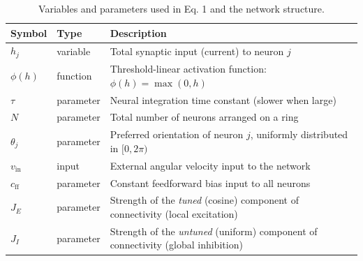 \documentclass[11pt,a4paper]{article}
\begin{document}
\begin{table}[h!]
\centering
\begin{tabular}{@{}llp{9cm}@{}}
\toprule
\textbf{Symbol} & \textbf{Type} & \textbf{Description} \\
\midrule
\( h_j \) & variable & Total synaptic input (current) to neuron \( j \) \\
\( \phi(h) \) & function & Threshold-linear activation function: \( \phi(h) = \max(0, h) \) \\
\( \tau \) & parameter & Neural integration time constant (slower when large) \\
\( N \) & parameter & Total number of neurons arranged on a ring \\
\( \theta_j \) & parameter & Preferred orientation of neuron \( j \), uniformly distributed in \([0, 2\pi)\) \\
\( v_{\text{in}} \) & input & External angular velocity input to the network \\
\( c_{\text{ff}} \) & parameter & Constant feedforward bias input to all neurons \\
\( J_E \) & parameter & Strength of the \emph{tuned} (cosine) component of connectivity (local excitation) \\
\( J_I \) & parameter & Strength of the \emph{untuned} (uniform) component of connectivity (global inhibition) \\
\bottomrule
\end{tabular}
\caption{Variables and parameters used in Eq. 1 and the network structure.}
\end{table}
\end{document}
